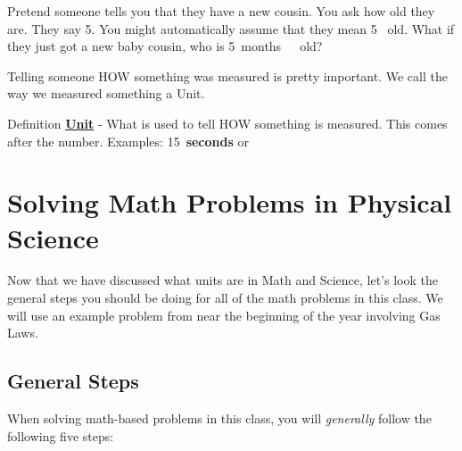\documentclass[../../Main/main.tex]{subfiles}
\begin{document}
Pretend someone tells you that they have a new cousin.  You ask how old they are.  They say 5.  You might automatically assume that they mean \num{5}~\unit{\years} old.  What if they just got a new baby cousin, who is \qty{5}{months\ old}?

Telling someone HOW something was measured is pretty important.  We call the way we measured something a Unit.

\begin{displayquote}
	\begin{boxBox}{Definition}
		{\large\textbf{\underline{Unit}}} - What is used to tell HOW something is measured.  This comes after the number. Examples: \qty{15}{\textbf{seconds}} or
	\end{boxBox}
\end{displayquote}

\section{Solving Math Problems in Physical Science}

Now that we have discussed what units are in Math and Science, let's look the general steps you should be doing for all of the math problems in this class.  We will use an example problem from near the beginning of the year involving Gas Laws.


\subsection{General Steps}
When solving math-based problems in this class, you will \emph{generally} follow the following five steps:
\end{document}
